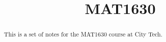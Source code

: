\documentclass{xourse}
\title{MAT1630}
\begin{document}
  
\begin{abstract} %
This is a set of notes for the MAT1630 course at City Tech.  
\end{abstract}  
\maketitle  
 
\end{document}
